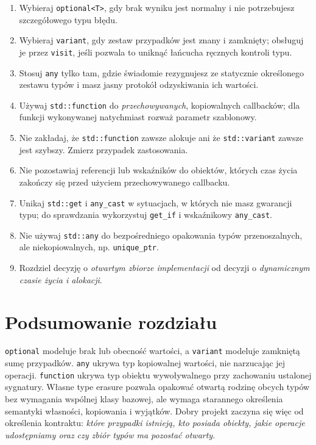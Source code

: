 \begin{enumerate}
\item Wybieraj \texttt{optional<T>}, gdy brak wyniku jest normalny i
      nie potrzebujesz szczegółowego typu błędu.
\item Wybieraj \texttt{variant}, gdy zestaw przypadków jest znany
      i zamknięty; obsługuj je przez \texttt{visit}, jeśli pozwala to
      uniknąć łańcucha ręcznych kontroli typu.
\item Stosuj \texttt{any} tylko tam, gdzie świadomie rezygnujesz
      ze statycznie określonego zestawu typów i masz jasny protokół
      odzyskiwania ich wartości.
\item Używaj \texttt{std::function} do \emph{przechowywanych},
      kopiowalnych callbacków; dla funkcji wykonywanej natychmiast
      rozważ parametr szablonowy.
\item Nie zakładaj, że \texttt{std::function} zawsze alokuje ani
      że \texttt{std::variant} zawsze jest szybszy. Zmierz przypadek
      zastosowania.
\item Nie pozostawiaj referencji lub wskaźników do obiektów, których
      czas życia zakończy się przed użyciem przechowywanego callbacku.
\item Unikaj \texttt{std::get} i \texttt{any\_cast} w sytuacjach,
      w których nie masz gwarancji typu; do sprawdzania wykorzystuj
      \texttt{get\_if} i wskaźnikowy \texttt{any\_cast}.
\item Nie używaj \texttt{std::any} do bezpośredniego opakowania
      typów przenoszalnych, ale niekopiowalnych, np. \texttt{unique\_ptr}.
\item Rozdziel decyzję o \emph{otwartym zbiorze implementacji} od
      decyzji o \emph{dynamicznym czasie życia i alokacji}.
\end{enumerate}

\section*{Podsumowanie rozdziału}

\texttt{optional} modeluje brak lub obecność wartości, a
\texttt{variant} modeluje zamkniętą sumę przypadków. \texttt{any}
ukrywa typ kopiowalnej wartości, nie narzucając jej operacji.
\texttt{function} ukrywa typ obiektu wywoływalnego przy zachowaniu
ustalonej sygnatury. Własne type erasure pozwala opakować otwartą
rodzinę obcych typów bez wymagania wspólnej klasy bazowej, ale wymaga
starannego określenia semantyki własności, kopiowania i wyjątków.
Dobry projekt zaczyna się więc od określenia kontraktu: \emph{które
przypadki istnieją, kto posiada obiekty, jakie operacje udostępniamy
oraz czy zbiór typów ma pozostać otwarty}.

